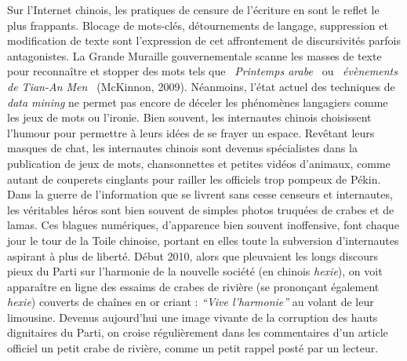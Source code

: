 \bigskip

{\color{black}
Sur l'Internet chinois, les pratiques de censure de l'\'ecriture en sont le reflet le plus frappants. Blocage de
mots-cl\'es, d\'etournements de langage, suppression et modification de texte sont l'expression de cet affrontement de
discursivit\'es parfois antagonistes. La Grande Muraille gouvernementale scanne les masses de texte pour reconna\^itre
et stopper des mots tels que {\guillemotleft}~\textit{Printemps arabe~}{\guillemotright} ou
{\guillemotleft}~\textit{\'ev\`enements de Tian-An Men~}{\guillemotright} (McKinnon, 2009). N\'eanmoins, l'\'etat
actuel des techniques de \textit{data mining} ne permet pas encore de d\'eceler les ph\'enom\`enes langagiers comme les
jeux de mots ou l'ironie. Bien souvent, les internautes chinois choisissent l'humour pour permettre \`a leurs id\'ees
de se frayer un espace. Rev\^etant leurs masques de chat, les internautes chinois sont devenus sp\'ecialistes dans la
publication de jeux de mots, chansonnettes et petites vid\'eos d'animaux, comme autant de couperets cinglants pour
railler les officiels trop pompeux de P\'ekin. Dans la guerre de l'information que se livrent sans cesse censeurs et
internautes, les v\'eritables h\'eros sont bien souvent de simples photos truqu\'ees de crabes et de lamas. Ces blagues
num\'eriques, d'apparence bien souvent inoffensive, font chaque jour le tour de la Toile chinoise, portant en elles
toute la subversion d'internautes aspirant \`a plus de libert\'e. D\'ebut 2010, alors que pleuvaient les longs discours
pieux du Parti sur l'harmonie de la nouvelle soci\'et\'e (en chinois \textit{hexie}), on voit appara\^itre en ligne des
essaims de crabes de rivi\`ere (se pronon\c{c}ant \'egalement \textit{hexie}) couverts de cha\^ines en or criant :
\textit{{}``Vive l'harmonie'' }au volant de leur limousine. Devenus aujourd'hui une image vivante de la corruption des
hauts dignitaires du Parti, on croise r\'eguli\`erement dans les commentaires d'un article officiel un petit crabe de
rivi\`ere, comme un petit rappel post\'e par un lecteur.}


\bigskip


